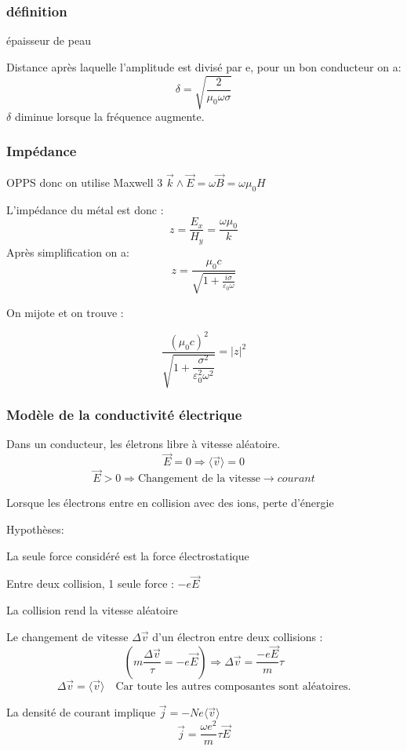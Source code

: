 \documentclass[12pt,a4paper]{report}
\begin{document}
\subsubsection{définition} épaisseur de peau

Distance après laquelle l'amplitude est divisé par e, pour un bon conducteur on a:
\[
	\delta = \sqrt{\dfrac{2}{\mu_0 \omega \sigma}}
\]
\(\delta\) diminue lorsque la fréquence augmente.

\subsubsection{Impédance}

OPPS donc on utilise Maxwell 3 \(\vec{k} \wedge \vec{E} = \omega \vec{B} = \omega \mu_0 H\)

L'impédance du métal est donc :
\[
	z = \dfrac{E_x}{H_y} = \dfrac{\omega \mu_0}{k}
\]
Après simplification on a:
\[
	z = \dfrac{\mu_0 c}{\sqrt{1 + \frac{i\sigma}{\varepsilon_0 \omega}}}
\]

On mijote et on trouve :

\[
	\dfrac{\left( \mu_0 c\right)^2}{\sqrt{1+\dfrac{\sigma^2}{\varepsilon^2_0 \omega^2}}} = \vert z \vert^2
\]

\subsubsection{Modèle de la conductivité électrique}

Dans un conducteur, les életrons libre à vitesse aléatoire.
\[
	\vec{E} = 0 \Rightarrow \langle \vec{v} \rangle = 0
\]
\[
	\vec{E} > 0 \Rightarrow \text{Changement de la vitesse} \rightarrow courant
\]

Lorsque les électrons entre en collision avec des ions, perte d'énergie

Hypothèses:

La seule force considéré est la force électrostatique

Entre deux collision, 1 seule force : \(-e\vec{E}\)

La collision rend la vitesse aléatoire

Le changement de vitesse \(\Delta \vec{v}\) d'un électron entre deux collisions :
\[
	\left( m \dfrac{\Delta \vec{v}}{\tau} = -e \vec{E} \right) \Rightarrow \Delta \vec{v} = \dfrac{-e \vec{E}}{m}\tau
\]
\[
	\Delta \vec{v} = \langle \vec{v} \rangle \quad \text{Car toute les autres composantes sont aléatoires.}
\]

La densité de courant implique \(\vec{j} = -N e \langle \vec{v} \rangle \)
\[
	\vec{j} = \dfrac{\omega e^2}{m}\tau \vec{E}
\]
\end{document}
